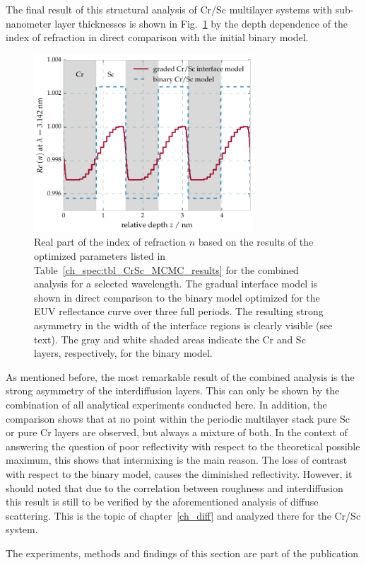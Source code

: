 The final result of this structural analysis of Cr/Sc multilayer systems with sub-nanometer layer thicknesses is shown in Fig.~\ref{ch_spec:fig_CrSc_electron_density_profile} by the depth dependence of the index of refraction in direct comparison with the initial binary model.
\begin{figure}[htbp]
  \centering
  \includegraphics[width=0.73\textwidth]{img/CrSc_binary_vs_fitted_gradual_model}
  \caption{Real part of the index of refraction $n$  based on the results of 
the optimized parameters listed in Table~\ref{ch_spec:tbl_CrSc_MCMC_results} for the combined 
analysis for a selected wavelength. The gradual interface model is shown in 
direct comparison to the binary model optimized for the EUV reflectance curve 
over three full periods. The resulting strong asymmetry in the width of the 
interface regions is clearly visible (see text). The gray and white shaded 
areas indicate the Cr and Sc layers, respectively, for the binary model.}
  \label{ch_spec:fig_CrSc_electron_density_profile}
\end{figure}
As mentioned before, the most remarkable result of the combined analysis is the strong asymmetry of the interdiffusion layers. This can only be shown by the combination of all 
analytical experiments conducted here. In addition, the comparison shows that at no point within the periodic multilayer stack pure Sc or pure Cr layers are observed, but always a mixture of both. In the context of answering the question of poor reflectivity with respect to the theoretical possible maximum, this shows that intermixing is the main reason. The loss of contrast with respect to the binary model, causes the diminished reflectivity. However, it should noted that due to the correlation between roughness and interdiffusion this result is still to be verified by the aforementioned analysis of diffuse scattering. This is the topic of chapter~\ref{ch_diff} and analyzed there for the Cr/Sc system.

The experiments, methods and findings of this section are part of the publication 


